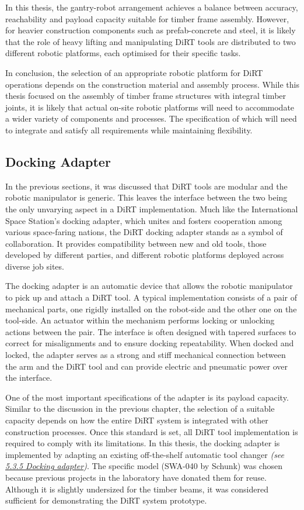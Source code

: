 In this thesis, the gantry-robot arrangement achieves a balance between accuracy, reachability and payload capacity suitable for timber frame assembly. However, for heavier construction components such as prefab-concrete and steel, it is likely that the role of heavy lifting and manipulating DiRT tools are distributed to two different robotic platforms, each optimised for their specific tasks.

In conclusion, the selection of an appropriate robotic platform for DiRT operations depends on the construction material and assembly process. While this thesis focused on the assembly of timber frame structures with integral timber joints, it is likely that actual on-site robotic platforms will need to accommodate a wider variety of components and processes. The specification of which will need to integrate and satisfy all requirements while maintaining flexibility.

\subsection{Docking Adapter}
\label{subsection:discussion_docking_adapter}

In the previous sections, it was discussed that DiRT tools are modular and the robotic manipulator is generic. This leaves the interface between the two being the only unvarying aspect in a DiRT implementation. Much like the International Space Station's docking adapter, which unites and fosters cooperation among various space-faring nations, the DiRT docking adapter stands as a symbol of collaboration. It provides compatibility between new and old tools, those developed by different parties, and different robotic platforms deployed across diverse job sites.

The docking adapter is an automatic device that allows the robotic manipulator to pick up and attach a DiRT tool. A typical implementation consists of a pair of mechanical parts, one rigidly installed on the robot-side and the other one on the tool-side. An actuator within the mechanism performs locking or unlocking actions between the pair. The interface is often designed with tapered surfaces to correct for misalignments and to ensure docking repeatability. When docked and locked, the adapter serves as a strong and stiff mechanical connection between the arm and the DiRT tool and can provide electric and pneumatic power over the interface.

One of the most important specifications of the adapter is its payload capacity. Similar to the discussion in the previous chapter, the selection of a suitable capacity depends on how the entire DiRT system is integrated with other construction processes. Once this standard is set, all DiRT tool implementation is required to comply with its limitations. In this thesis, the docking adapter is implemented by adapting an existing off-the-shelf automatic tool changer \textit{(see \ul{5.3.5 Docking adapter})}. The specific model (SWA-040 by Schunk) was chosen because previous projects in the laboratory have donated them for reuse. Although it is slightly undersized for the timber beams, it was considered sufficient for demonstrating the DiRT system prototype. 

